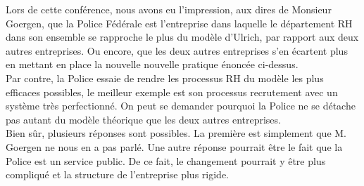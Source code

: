 Lors de cette conférence, nous avons eu l'impression, aux dires de Monsieur Goergen, que la Police Fédérale est l'entreprise dans laquelle le département RH dans son ensemble se rapproche le plus du modèle d'Ulrich, par rapport aux deux autres entreprises. Ou encore, que les deux autres entreprises s'en écartent plus en mettant en place la nouvelle nouvelle pratique énoncée ci-dessus.\\
Par contre, la Police essaie de rendre les processus RH du modèle les plus efficaces possibles, le meilleur exemple est son processus recrutement avec un système très perfectionné. On peut se demander pourquoi la Police ne se détache pas autant du modèle théorique que les deux autres entreprises.\\
Bien sûr, plusieurs réponses sont possibles. La première est simplement que M. Goergen ne nous en a pas parlé. Une autre réponse pourrait être le fait que la Police est un service public. De ce fait, le changement pourrait y être plus compliqué et la structure de l'entreprise plus rigide.\newline